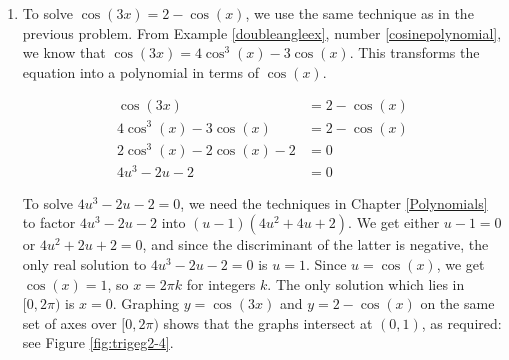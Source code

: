{\begin{enumerate}
\drawexampleline

This gives $u = \frac{1}{2}$ or $u = 1$.  Since $u = \cos(x)$, we get $\cos(x) = \frac{1}{2}$ or $\cos(x) = 1$.  Solving  $\cos(x) = \frac{1}{2}$, we get $x = \frac{\pi}{3} + 2\pi k$ or $x = \frac{5\pi}{3} + 2\pi k$ for integers $k$.  From $\cos(x) = 1$, we get $x = 2\pi k$ for integers $k$.  The answers which lie in $[0,2\pi)$ are $x =0$,  $\frac{\pi}{3}$, and $\frac{5\pi}{3}$.  Graphing $y = \cos(2x)$ and $y = 3\cos(x) - 2$ in Figure \ref{fig:trigeg2-3}, we find, after a little extra effort, that the curves intersect in three places on $[0,2\pi)$, and  the $x$-coordinates of these points confirm our results.


\item  To solve $\cos(3x) = 2- \cos(x)$, we use the same technique as in the previous problem.  From Example \ref{doubleangleex}, number \ref{cosinepolynomial}, we know that $\cos(3x) = 4\cos^{3}(x) - 3\cos(x)$.  This transforms the equation into a polynomial in terms of $\cos(x)$.


\begin{align*}
\cos(3x) & = 2- \cos(x)  \\
4\cos^{3}(x) - 3\cos(x) & =  2- \cos(x)  \\
2\cos^{3}(x) - 2\cos(x) -2  & =  0  \\
4 u^3 - 2 u -2  & =  0  \tag*{Let $u = \cos(x)$.}
\end{align*}

To solve $4u^3-2u-2=0$, we need the techniques in Chapter \ref{Polynomials} to factor $4u^3-2u-2$ into $(u-1)\left(4u^2+4u+2\right)$.  We get either $u-1 = 0$ or  $4u^2+2u+2=0$, and since the discriminant of the latter is negative, the only real solution to $4u^3-2u-2=0$ is $u = 1$.  Since $u = \cos(x)$, we get $\cos(x) = 1$, so $x = 2\pi k$ for integers $k$.  The only solution which lies in $[0,2\pi)$ is $x = 0$.  Graphing $y = \cos(3x)$ and $y = 2- \cos(x)$ on the same set of axes over $[0,2\pi)$ shows that the graphs intersect at  $(0,1)$, as required: see Figure \ref{fig:trigeg2-4}.




\end{enumerate}}
